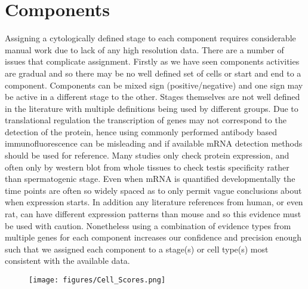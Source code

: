 \section{Components}

Assigning a cytologically defined stage to each component requires considerable manual work due to lack of any high resolution data. There are a number of issues that complicate assignment. Firstly as we have seen components activities are gradual and so there may be no well defined set of cells or start and end to a component. Components can be mixed sign (positive/negative) and one sign may be active in a different stage to the other. Stages themselves are not well defined in the literature with multiple definitions being used by different groups. Due to translational regulation the transcription of genes may not correspond to the detection of the protein, hence using commonly performed antibody based immunofluorescence can be misleading and if available mRNA detection methods should be used for reference. Many studies only check protein expression, and often only by western blot from whole tissues to check testis specificity rather than spermatogenic stage. Even when mRNA is quantified developmentally the time points are often so widely spaced as to only permit vague conclusions about when expression starts. In addition any literature references from human, or even rat, can have different expression patterns than mouse and so this evidence must be used with caution. Nonetheless using a combination of evidence types from multiple genes for each component increases our confidence and precision enough such that we assigned each component to a stage(s) or cell type(s) most consistent with the available data.


\begin{figure}[H]
	\centering
	\texttt{[image: figures/Cell\_Scores.png]}
	\caption{}
	\label{fig:Cell_Scores}
\end{figure}




